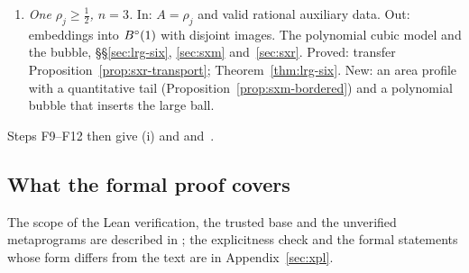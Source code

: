 \begin{enumerate}[label=\textbf{H\arabic*},leftmargin=*,itemsep=3pt]
 and~\ref{sec:two}. Proved: Lemma~\ref{lem:lrg-slit}, Theorem~\ref{thm:lrg-high}; statement . New: the
 return to the shell about the reserved ball is a closed formula.
\item \emph{One $\rho_j\ge\frac12$, $n=3$.} In: $A=\rho_j$ and valid rational auxiliary data. Out: embeddings into $B^{\circ}(1)$
 with disjoint images. The polynomial cubic model and the bubble, \S\S\ref{sec:lrg-six}, \ref{sec:sxm}
 and~\ref{sec:sxr}. Proved: transfer Proposition~\ref{prop:sxr-transport}; Theorem~\ref{thm:lrg-six}. New: an area profile with a
 quantitative tail (Proposition~\ref{prop:sxm-bordered}) and a polynomial bubble that inserts the large ball.
\end{enumerate}
Steps F9--F12 then give (i) and  and~.

\subsection{What the formal proof covers}\label{sec:guide-trust}

The scope of the Lean verification, the trusted base and the unverified metaprograms are described in ;
the explicitness check and the formal statements whose form differs from the text are in Appendix~\ref{sec:xpl}.

